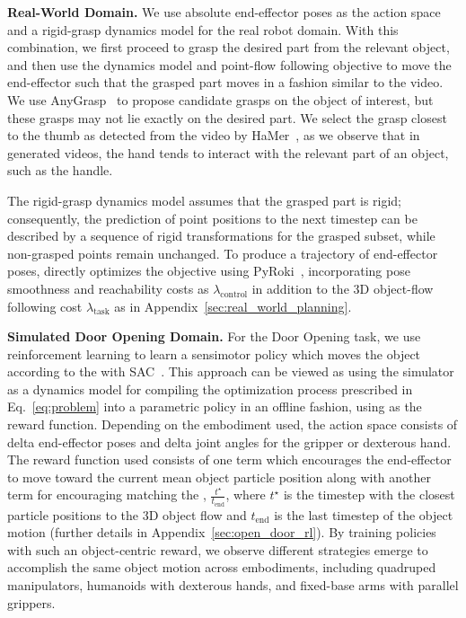 \textbf{Real-World Domain.} We use absolute end-effector poses as the action space and a rigid-grasp dynamics model for the real robot domain. With this combination, we first proceed to grasp the desired part from the relevant object, and then use the dynamics model and point-flow following objective to move the end-effector such that the grasped part moves in a fashion similar to the video. We use AnyGrasp~\cite{fang2023anygrasp} to propose candidate grasps on the object of interest, but these grasps may not lie exactly on the desired part. We select the grasp closest to the thumb as detected from the video by HaMer~\cite{pavlakos2024reconstructing}, as we observe that in generated videos, the hand tends to interact with the relevant part of an object, such as the handle.

The rigid-grasp dynamics model assumes that the grasped part is rigid; consequently, the prediction of point positions to the next timestep can be described by a sequence of rigid transformations for the grasped subset, while non-grasped points remain unchanged. To produce a trajectory of end-effector poses, \algo directly optimizes the objective using PyRoki~\cite{kim2025pyroki}, incorporating pose smoothness and reachability costs as $\lambda_{\text{control}}$ in addition to the 3D object-flow following cost $\lambda_{\text{task}}$ as in Appendix~\ref{sec:real_world_planning}.

\textbf{Simulated Door Opening Domain.}
For the Door Opening task, we use reinforcement learning to learn a sensimotor policy which moves the object according to the \flow with SAC~\cite{haarnojaSAC2018}. This approach can be viewed as using the simulator as a dynamics model for compiling the optimization process prescribed in Eq.~\ref{eq:problem} into a parametric policy in an offline fashion, using \flow as the reward function. Depending on the embodiment used, the action space consists of delta end-effector poses and delta joint angles for the gripper or dexterous hand. The reward function used consists of one term which encourages the end-effector to move toward the current mean object particle position along with another term for encouraging matching the \flow, $\frac{t^{\star}}{t_{\text{end}}}$, where $t^{\star}$ is the timestep with the closest particle positions to the 3D object flow and $t_{\text{end}}$ is the last timestep of the object motion (further details in Appendix~\ref{sec:open_door_rl}).
By training policies with such an object-centric reward, we observe different strategies emerge to accomplish the same object motion across embodiments, including quadruped manipulators, humanoids with dexterous hands, and fixed-base arms with parallel grippers.